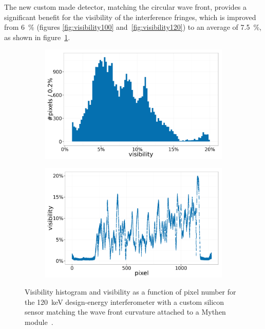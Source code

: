 The new custom made detector, matching the circular wave front, provides a
significant benefit for the visibility of the interference fringes, which is
improved from \SI{6}{\percent} (figures \ref{fig:visibility100}
and~\ref{fig:visibility120}) to an average of \SI{7.5}{\percent}, as shown in
figure~\ref{fig:mythen-visibility}.

\begin{figure}[htb]
    \centering
    \begin{subfigure}[b]{.49\textwidth}
    \centering
    \includegraphics[width=\textwidth]{gfx/mythen-edge-on/visibility.png}
    \caption{}
    \label{fig:mythen-visibility}
    \end{subfigure}
    \hfill
    \begin{subfigure}[b]{.49\textwidth}
    \centering
    \includegraphics[width=\textwidth]{gfx/mythen-edge-on/pixel_visibility.png}
    \caption{}
    \label{fig:mythen-visibility-pixel}
    \end{subfigure}
    \caption[Visibility of the edge-on grating interferometer with a custom
    detector.]{Visibility histogram and visibility as a function of pixel
        number for the \SI{120}{\kilo\eV} design-energy interferometer with
        a custom silicon sensor matching the wave front curvature attached
        to a Mythen module~\parencite{SCHMITT2003267}.
    }
\end{figure}

